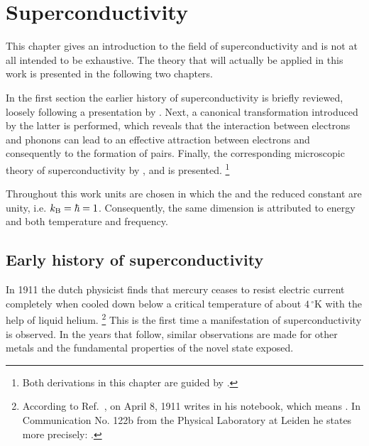 
\chapter{Superconductivity}
\label{superconductivity}

This chapter gives an introduction to the field of superconductivity and is not
at all intended to be exhaustive. The theory that will actually be applied in
this work is presented in the following two chapters.

In the first section the earlier history of superconductivity is briefly
reviewed, loosely following a presentation by 
\cite{Froehlich82}. Next, a canonical transformation introduced by the latter is
performed, which reveals that the interaction between electrons and phonons can
lead to an effective attraction between electrons and consequently to the
formation of  pairs. Finally, the corresponding microscopic theory
of superconductivity by ,  and  is
presented.%
%
\footnote{Both derivations in this chapter are guided by 
\cite{Czycholl08}.}

Throughout this work units are chosen in which the  and the
reduced  constant are unity, i.e. $k \sb{\text{B}} = \hbar = 1$.
Consequently, the same dimension is attributed to energy and both temperature
and frequency.

\section{Early history of superconductivity}

In 1911 the dutch physicist  finds that mercury ceases to
resist electric current completely when cooled down below a critical temperature
of about $4\,^\circ \mathrm K$ with the help of liquid helium.%
%
\footnote{According to Ref.~, on April 8, 1911
 writes  in his notebook, which
means . In Communication No. 122b
from the Physical Laboratory at Leiden he states more precisely: 
\cite{KamerlinghOnnes11}.}
%
This is the first time a manifestation of superconductivity is observed. In the
years that follow, similar observations are made for other metals and the
fundamental properties of the novel state exposed.

